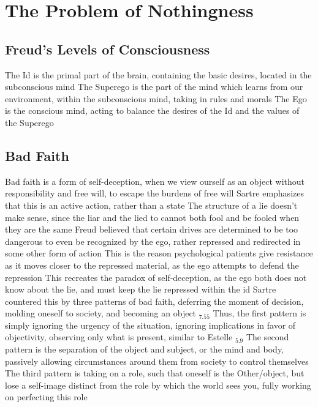 \documentclass[11 pt, twoside]{article}
\newenvironment{outline*}
{
	\begin{outline}[enumerate]
	}
	{\end{outline}
}
\newcommand{\footb}[2]{\hyperlink{#1}{$_{#1.#2}$}}
\begin{document}
\section{The Problem of Nothingness}
\subsection{Freud's Levels of Consciousness}
\begin{outline*}
\1 The Id is the primal part of the brain, containing the basic desires, located in the subconscious mind
\1 The Superego is the part of the mind which learns from our environment, within the subconscious mind, taking in rules and morals
\1 The Ego is the conscious mind, acting to balance the desires of the Id and the values of the Superego
\end{outline*}
\subsection{Bad Faith}
\begin{outline*}
\1 Bad faith is a form of self-deception, when we view ourself as an object without responsibility and free will, to escape the burdens of free will
\2 Sartre emphasizes that this is an active action, rather than a state
\1 The structure of a lie doesn't make sense, since the liar and the lied to cannot both fool and be fooled when they are the same
\1 Freud believed that certain drives are determined to be too dangerous to even be recognized by the ego, rather repressed and redirected in some other form of action
\2 This is the reason psychological patients give resistance as it moves closer to the repressed material, as the ego attempts to defend the repression
\2 This recreates the paradox of self-deception, as the ego both does not know about the lie, and must keep the lie repressed within the id
\1 Sartre countered this by three patterns of bad faith, deferring the moment of decision, molding oneself to society, and becoming an object \footb{7}{55}
\2 Thus, the first pattern is simply ignoring the urgency of the situation, ignoring implications in favor of objectivity, observing only what is present, similar to Estelle \footb{5}{9}
\2 The second pattern is the separation of the object and subject, or the mind and body, passively allowing circumstances around them from society to control themselves
\2 The third pattern is taking on a role, such that oneself is the Other/object, but lose a self-image distinct from the role by which the world sees you, fully working on perfecting this role
\end{outline*}
\end{document}
